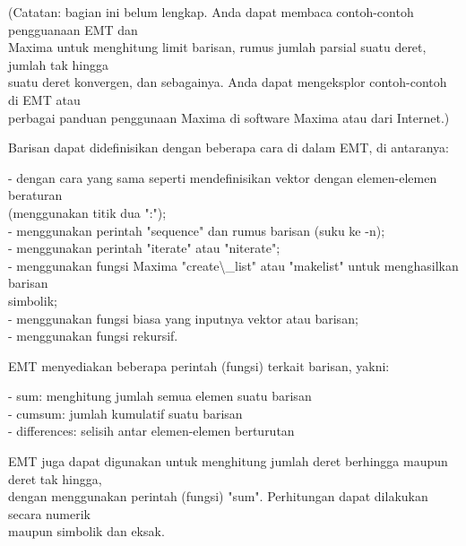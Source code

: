 \documentclass[a4paper,10pt]{article}
\begin{document}
\begin{eulernotebook}
\begin{eulercomment}
\begin{eulercomment}
\begin{eulercomment}
\begin{eulercomment}
\begin{eulercomment}
\begin{eulercomment}
\begin{eulercomment}
\begin{eulercomment}
\begin{eulercomment}
\begin{eulercomment}
\begin{eulercomment}
\begin{eulercomment}
\begin{eulercomment}
\begin{eulercomment}
\begin{eulercomment}
\begin{eulercomment}
\begin{eulercomment}
\begin{eulercomment}
\begin{eulercomment}
\begin{eulercomment}
\begin{eulercomment}
\begin{eulercomment}
\begin{eulercomment}
\begin{eulercomment}
\begin{eulercomment}
\begin{eulercomment}
\begin{eulercomment}
(Catatan: bagian ini belum lengkap. Anda dapat membaca contoh-contoh
pengguanaan EMT dan\\
Maxima untuk menghitung limit barisan, rumus jumlah parsial suatu
deret, jumlah tak hingga\\
suatu deret konvergen, dan sebagainya. Anda dapat mengeksplor
contoh-contoh di EMT atau\\
perbagai panduan penggunaan Maxima di software Maxima atau dari
Internet.)

Barisan dapat didefinisikan dengan beberapa cara di dalam EMT, di
antaranya:

- dengan cara yang sama seperti mendefinisikan vektor dengan
elemen-elemen beraturan\\
(menggunakan titik dua ":");\\
- menggunakan perintah "sequence" dan rumus barisan (suku ke -n);\\
- menggunakan perintah "iterate" atau "niterate";\\
- menggunakan fungsi Maxima "create\textbackslash{}\_list" atau "makelist" untuk
menghasilkan barisan\\
simbolik;\\
- menggunakan fungsi biasa yang inputnya vektor atau barisan;\\
- menggunakan fungsi rekursif.

EMT menyediakan beberapa perintah (fungsi) terkait barisan, yakni:

- sum: menghitung jumlah semua elemen suatu barisan\\
- cumsum: jumlah kumulatif suatu barisan\\
- differences: selisih antar elemen-elemen berturutan

EMT juga dapat digunakan untuk menghitung jumlah deret berhingga
maupun deret tak hingga,\\
dengan menggunakan perintah (fungsi) "sum". Perhitungan dapat
dilakukan secara numerik\\
maupun simbolik dan eksak.


\end{eulercomment}
\end{eulercomment}
\end{eulercomment}
\end{eulercomment}
\end{eulercomment}
\end{eulercomment}
\end{eulercomment}
\end{eulercomment}
\end{eulercomment}
\end{eulercomment}
\end{eulercomment}
\end{eulercomment}
\end{eulercomment}
\end{eulercomment}
\end{eulercomment}
\end{eulercomment}
\end{eulercomment}
\end{eulercomment}
\end{eulercomment}
\end{eulercomment}
\end{eulercomment}
\end{eulercomment}
\end{eulercomment}
\end{eulercomment}
\end{eulercomment}
\end{eulercomment}
\end{eulercomment}
\end{eulernotebook}
\end{document}
